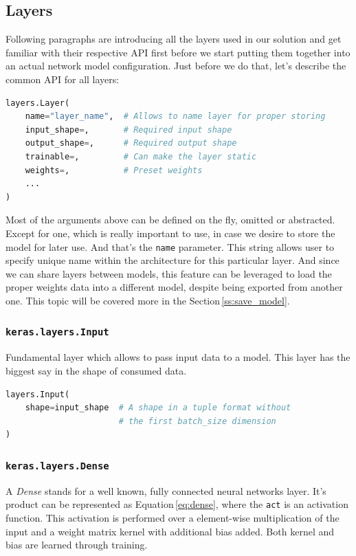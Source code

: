 \subsection{Layers}

Following paragraphs are introducing all the layers used in our solution and get familiar with their respective API first before we start putting them together into an actual network model configuration. Just before we do that, let's describe the common API for all layers:

\begin{lstlisting}[language=Python, caption=Common layer API.]
layers.Layer(
    name="layer_name",  # Allows to name layer for proper storing
    input_shape=,       # Required input shape
    output_shape=,      # Required output shape
    trainable=,         # Can make the layer static
    weights=,           # Preset weights
    ...
)
\end{lstlisting}

Most of the arguments above can be defined on the fly, omitted or abstracted. Except for one, which is really important to use, in case we desire to store the model for later use. And that's the \texttt{name} parameter. This string allows user to specify unique name within the architecture for this particular layer. And since we can share layers between models, this feature can be leveraged to load the proper weights data into a different model, despite being exported from another one. This topic will be covered more in the Section\,\ref{ss:save_model}.

\subsubsection{\texttt{keras.layers.Input}}

Fundamental layer which allows to pass input data to a model. This layer has the biggest say in the shape of consumed data.

\begin{lstlisting}[language=Python, caption=Input layer.]
layers.Input(
    shape=input_shape  # A shape in a tuple format without
                       # the first batch_size dimension
)
\end{lstlisting}

\subsubsection{\texttt{keras.layers.Dense}}

A \textit{Dense} stands for a well known, fully connected neural networks layer. It's product can be represented as Equation\,\ref{eq:dense}, where the \texttt{act} is an activation function. This activation is performed over a element-wise multiplication of the input and a weight matrix kernel with additional bias added. Both kernel and bias are learned through training.

